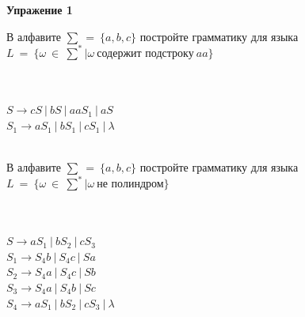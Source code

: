 \documentclass[10pt]{article}
\begin{document}
	{\huge\textbf{Упражение 1}}\\
	{\large
	\begin{enumerate}
		{\Large\item В алфавите $\sum\ =\ \{a,b,c\}$ постройте грамматику для языка $L\ =\ \{\omega\ \in \ \sum^*|\omega\ \text{содержит подстроку} \ aa\}$} \\\\
		
		$S\rightarrow cS\ | \ bS \ | \ aaS_1 \ | \ aS$\\
		$S_1\rightarrow aS_1 \ | \ bS_1 \ | \ cS_1 \ | \ \lambda$\\\\
		
		{\Large\item В алфавите $\sum\ =\ \{a,b,c\}$ постройте грамматику для языка $L\ =\ \{\omega\ \in \ \sum^*|\omega\ \text{не полиндром} \}$} \\\\
		$S\rightarrow aS_1\ | \ bS_2 \ | \ cS_3 $\\
		$S_1\rightarrow S_4b \ | \ S_4c \ | \ Sa $\\
		$S_2\rightarrow S_4a \ | \ S_4c \ | \ Sb $\\
		$S_3\rightarrow S_4a \ | \ S_4b \ | \ Sc $\\
		$S_4\rightarrow aS_1\ | \ bS_2 \ | \ cS_3 \ | \ \lambda$\\\\
		

\end{enumerate}}
\end{document}
